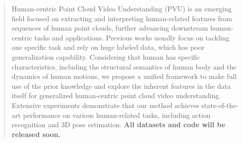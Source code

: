 \begin{abstract}
Human-centric Point Cloud Video Understanding (PVU) is an emerging field focused on extracting and interpreting human-related features from sequences of human point clouds, further advancing downstream human-centric tasks and applications. Previous works usually focus on tackling one specific task and rely on huge labeled data, which has poor generalization capability. Considering that human has specific characteristics, including the structural semantics of human body and the dynamics of human motions, we propose a unified framework to make full use of the prior knowledge and explore the inherent features in the data itself for generalized human-centric point cloud video understanding. Extensive experiments demonstrate that our method achieves state-of-the-art performance on various human-related tasks, including action recognition and 3D pose estimation. \textbf{All datasets and code will be released soon.}




\end{abstract}
